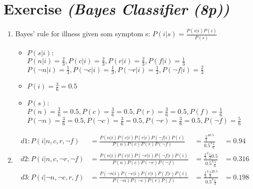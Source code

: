 \documentclass{article}
\begin{document}
\section{Exercise \textit{(Bayes Classifier (8p))}}
\begin{enumerate}
    \item Bayes' rule for illness given som symptom s:
            $P(i|s) =  \frac{P(s|i)P(i)}{P(s)}$\\
        \begin{itemize}
            \item $P(s|i):$\\
                $P(n|i) = \frac{2}{3},
                P(c|i) = \frac{2}{3},
                P(r|i) = \frac{2}{3},
                P(f|i) = \frac{1}{3}$\\
                $P(\lnot n|i) = \frac{1}{3},
                P(\lnot c|i) = \frac{1}{3},
                P(\lnot r|i) = \frac{1}{3},
                P(\lnot f|i) = \frac{2}{3}$
            \item $P(i) = \frac{3}{6} = 0.5$\\
            \item $P(s):$\\
                $P(n) = \frac{3}{6} = 0.5,
                P(c) = \frac{3}{6} = 0.5,
                P(r) = \frac{3}{6} = 0.5,
                P(f) = \frac{1}{6}$\\
                $P(\lnot n) = \frac{3}{6} = 0.5,
                P(\lnot c) = \frac{3}{6} = 0.5,
                P(\lnot r) = \frac{3}{6} = 0.5,
                P(\lnot f) = \frac{5}{6}$
        \end{itemize}
    \item
        \begin{align*}
            d1: P(i|n,c,r,\lnot f) &= \frac{P(n|i)P(c|i)P(r|i)P(\lnot
        f|i)P(i)}{P(n)P(c)P(r)P(\lnot f)} &=
            \frac{\frac{2}{3}^40.5}{0.5^3\frac{5}{6}} &= 0.94\\
            d2: P(i|n,c,\lnot r,\lnot f) &=\frac{P(n|i)P(c|i)P(\lnot r|i)P(\lnot
        f|i)P(i)}{P(n)P(c)P(\lnot r)P(\lnot f)} &=
            \frac{\frac{2}{3}^4\frac{1}{3}0.5}{0.5^3\frac{5}{6}} &= 0.316\\
            d3: P(i|\lnot n,\lnot c,r,f) &=\frac{P(\lnot n|i)P(\lnot c|i)P(r|i)P(
        f|i)P(i)}{P(\lnot n)P(\lnot c)P(r)P(f)} &=
            \frac{\frac{1}{3}^3\frac{2}{3}^20.5}{0.5^3\frac{1}{3}} &= 0.198\\

\end{align*}
\end{enumerate}
\end{document}
